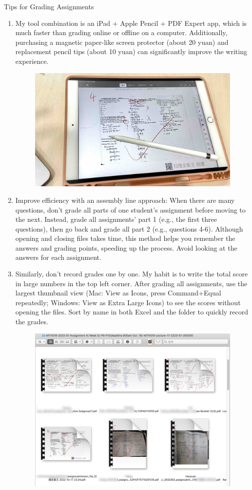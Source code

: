 \emptyline
Tips for Grading Assignments
\begin{enumerate}
    \item My tool combination is an iPad + Apple Pencil + PDF Expert app, which is much faster than grading online or offline on a computer. Additionally, purchasing a magnetic paper-like screen protector (about 20 yuan) and replacement pencil tips (about 10 yuan) can significantly improve the writing experience.
        \begin{figure}[H]
            \centering
            \includegraphics[width=0.5\columnwidth]{author-folder/Kai.Wu/marking_tools.jpg}
        \end{figure}
    \item Improve efficiency with an assembly line approach: When there are many questions, don’t grade all parts of one student’s assignment before moving to the next. Instead, grade all assignments’ part 1 (e.g., the first three questions), then go back and grade all part 2 (e.g., questions 4-6).  Although opening and closing files takes time, this method helps you remember the answers and grading points, speeding up the process. Avoid looking at the answers for each assignment.
    \item Similarly, don’t record grades one by one. My habit is to write the total score in large numbers in the top left corner. After grading all assignments, use the largest thumbnail view (Mac: View as Icons, press Command+Equal repeatedly; Windows: View as Extra Large Icons) to see the scores without opening the files. Sort by name in both Excel and the folder to quickly record the grades.
        \begin{figure}[H]
            \centering
            \includegraphics[width=0.7\columnwidth]{author-folder/Kai.Wu/tongchengji.jpg}

\end{figure}
\end{enumerate}

